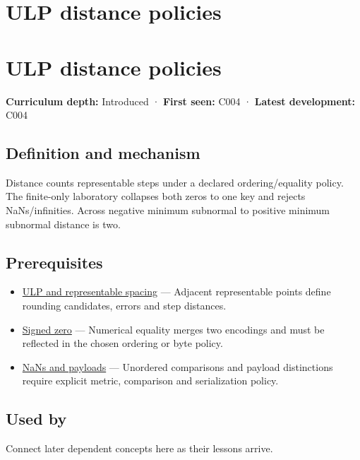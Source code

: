 \hypertarget{appendix-deca299ae4b8}{}
\section*{ULP distance policies}
\section{ULP distance policies}\label{appendix-deca299ae4b8-ulp-distance-policies}

\textbf{Curriculum depth:} Introduced · \textbf{First seen:} C004 · \textbf{Latest development:} C004

\subsection{Definition and mechanism}\label{appendix-deca299ae4b8-definition-and-mechanism}

Distance counts representable steps under a declared ordering/equality policy. The finite-only laboratory collapses both zeros to one key and rejects NaNs/infinities. Across negative minimum subnormal to positive minimum subnormal distance is two.

\subsection{Prerequisites}\label{appendix-deca299ae4b8-prerequisites}

\begin{itemize}
\tightlist
\item
  \hyperref[appendix-14bab4cab9d4]{ULP and representable spacing} --- Adjacent representable points define rounding candidates, errors and step distances.
\item
  \hyperref[appendix-3a048f032c1f]{Signed zero} --- Numerical equality merges two encodings and must be reflected in the chosen ordering or byte policy.
\item
  \hyperref[appendix-d6607cc4c235]{NaNs and payloads} --- Unordered comparisons and payload distinctions require explicit metric, comparison and serialization policy.
\end{itemize}

\subsection{Used by}\label{appendix-deca299ae4b8-used-by}

Connect later dependent concepts here as their lessons arrive.

